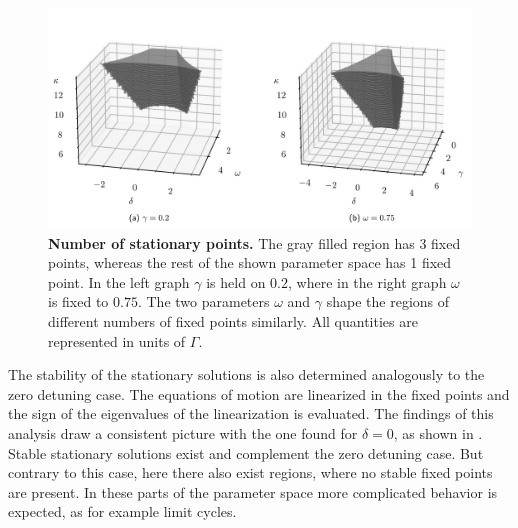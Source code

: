 \begin{figure}[H]
    \hspace*{-1.2cm}
    \includegraphics{pictures/numb_of_fixp_stab3d_gw.png}
    \caption{\textbf{Number of stationary points.} The gray filled region has 3 fixed points, whereas the rest of the shown parameter space has 1 fixed point. In the left graph $\gamma$ is held on $0.2$, where in the right graph $\omega$ is fixed to $0.75$. The two parameters $\omega$ and $\gamma$ shape the regions of different numbers of fixed points similarly. All quantities are represented in units of $\Gamma$.}%
    \label{fig:numb_of_fixp_3D}
\end{figure}
The stability of the stationary solutions is also determined analogously to the zero detuning case. The equations of motion are linearized in the fixed points and the sign of the eigenvalues of the linearization is evaluated. The findings of this analysis draw a consistent picture with the one found for $\delta=0$, as shown in . Stable stationary solutions exist and complement the zero detuning case. But contrary to this case, here there also exist regions, where no stable fixed points are present. In these parts of the parameter space more complicated behavior is expected, as for example limit cycles.
